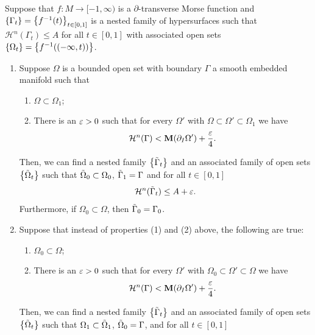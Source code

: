 \begin{lemma}\label{lem:extension}
    Suppose that $f: M \to [-1, \infty)$ is a $\partial$-transverse Morse function and $\left\{\Gamma_t\right\} = \left\{f^{-1}(t)\right\}_{t \in [0, 1]}$ is a nested family of hypersurfaces such that $\mathcal{H}^n(\Gamma_t) \leq A$ for all $t \in [0, 1]$ with associated open sets $\left\{\Omega_t\right\} = \left\{f^{-1}((-\infty, t))\right\}$.
    \begin{enumerate}
        \item[I.] Suppose $\Omega$ is a bounded open set with boundary $\Gamma$ a smooth embedded manifold such that
        \begin{enumerate}
            \item[(1)] $\Omega\subset\Omega_1$;
            \item[(2)] There is an $\varepsilon > 0$ such that for every $\Omega'$ with $\Omega \subset \Omega'\subset \Omega_1$ we have
            \begin{equation*}
                \mathcal{H}^n(\Gamma) < \mathbf{M}(\partial_I\Omega') + \frac{\varepsilon}{4}.
            \end{equation*}
        \end{enumerate}
        Then, we can find a nested family $\left\{\Tilde{\Gamma}_t\right\}$ and an associated family of open sets $\left\{\Tilde{\Omega}_t\right\}$ such that $\Tilde{\Omega}_0 \subset \Omega_0$, $\Tilde{\Gamma}_1 = \Gamma$ and for all $t \in [0, 1]$
        \begin{equation*}
            \mathcal{H}^n(\Tilde{\Gamma}_t) \leq A + \varepsilon.
        \end{equation*}
        Furthermore, if $\Omega_0 \subset \Omega$, then $\Tilde{\Gamma}_0 = \Gamma_0$.
        \item[II.] Suppose that instead of properties (1) and (2) above, the following are true:
        \begin{enumerate}
            \item[(1)'] $\Omega_0 \subset \Omega$;
            \item[(2)'] There is an $\varepsilon > 0$ such that for every $\Omega'$ with $\Omega_0\subset \Omega'\subset \Omega$ we have
            \begin{equation*}
                \mathcal{H}^n(\Gamma) < \mathbf{M}(\partial_I\Omega') + \frac{\varepsilon}{4}.
            \end{equation*}
        \end{enumerate}
        Then, we can find a nested family $\left\{\Tilde{\Gamma}_t\right\}$ and an associated family of open sets $\left\{\Tilde{\Omega}_t\right\}$ such that $\Omega_1 \subset \Tilde{\Omega}_1$, $\Tilde{\Omega}_0 = \Gamma$, and for all $t \in [0, 1]$

\end{enumerate}
\end{lemma}
